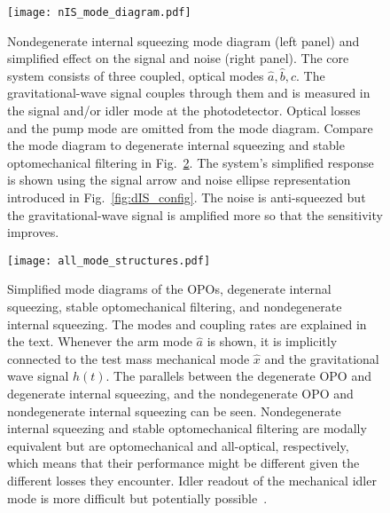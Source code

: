 \begin{figure}
    \centering
    \texttt{[image: nIS\_mode\_diagram.pdf]}
    \caption{ Nondegenerate internal squeezing mode diagram (left panel) and simplified effect on the signal and noise (right panel). The core system consists of three coupled, optical modes $\hat a,\hat b,\hat c$. The gravitational-wave signal couples through them and is measured in the signal and/or idler mode at the photodetector. Optical losses and the pump mode are omitted from the mode diagram. Compare the mode diagram to degenerate internal squeezing and stable optomechanical filtering in Fig.~\ref{fig:mode_diagram}. The system's simplified response is shown using the signal arrow and noise ellipse representation introduced in Fig.~\ref{fig:dIS_config}. The noise is anti-squeezed but the gravitational-wave signal is amplified more so that the sensitivity improves.}
    \label{fig:nIS_mode_diagram}
\end{figure}
\begin{figure}
    \centering
    \texttt{[image: all\_mode\_structures.pdf]}
    \caption{Simplified mode diagrams of the OPOs, degenerate internal squeezing, stable optomechanical filtering, and nondegenerate internal squeezing. The modes and coupling rates are explained in the text. Whenever the arm mode $\hat a$ is shown, it is implicitly connected to the test mass mechanical mode $\hat x$ and the gravitational wave signal $h(t)$. The parallels between the degenerate OPO and degenerate internal squeezing, and the nondegenerate OPO and nondegenerate internal squeezing can be seen. Nondegenerate internal squeezing and stable optomechanical filtering are modally equivalent but are optomechanical and all-optical, respectively, which means that their performance might be different given the different losses they encounter. Idler readout of the mechanical idler mode is more difficult but potentially possible~\cite{liEnhancingInterferometerSensitivity2021}.}
    \label{fig:mode_diagram}
\end{figure}

